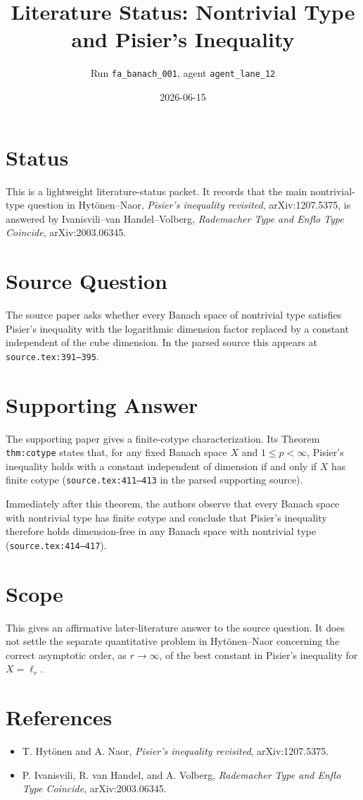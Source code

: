 \documentclass[11pt]{article}
\title{Literature Status: Nontrivial Type and Pisier's Inequality}
\author{Run \texttt{fa\_banach\_001}, agent \texttt{agent\_lane\_12}}
\date{2026-06-15}
\begin{document}
\maketitle

\section*{Status}

This is a lightweight literature-status packet. It records that the main
nontrivial-type question in Hytönen--Naor, \emph{Pisier's inequality
revisited}, arXiv:1207.5375, is answered by Ivanisvili--van Handel--Volberg,
\emph{Rademacher Type and Enflo Type Coincide}, arXiv:2003.06345.

\section*{Source Question}

The source paper asks whether every Banach space of nontrivial type satisfies
Pisier's inequality with the logarithmic dimension factor replaced by a
constant independent of the cube dimension. In the parsed source this appears
at \texttt{source.tex:391--395}.

\section*{Supporting Answer}

The supporting paper gives a finite-cotype characterization. Its Theorem
\texttt{thm:cotype} states that, for any fixed Banach space $X$ and
$1\le p<\infty$, Pisier's inequality holds with a constant independent of
dimension if and only if $X$ has finite cotype
(\texttt{source.tex:411--413} in the parsed supporting source).

Immediately after this theorem, the authors observe that every Banach space
with nontrivial type has finite cotype and conclude that Pisier's inequality
therefore holds dimension-free in any Banach space with nontrivial type
(\texttt{source.tex:414--417}).

\section*{Scope}

This gives an affirmative later-literature answer to the source question. It
does not settle the separate quantitative problem in Hytönen--Naor concerning
the correct asymptotic order, as $r\to\infty$, of the best constant in
Pisier's inequality for $X=\ell_r$.

\section*{References}

\begin{itemize}
\item T. Hytönen and A. Naor, \emph{Pisier's inequality revisited},
arXiv:1207.5375.
\item P. Ivanisvili, R. van Handel, and A. Volberg,
\emph{Rademacher Type and Enflo Type Coincide}, arXiv:2003.06345.
\end{itemize}
\end{document}
